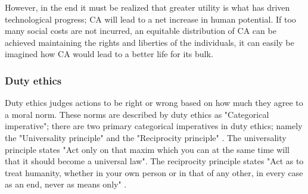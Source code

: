 
However, in the end it must be realized that greater utility is what has driven technological progress; CA will lead to a net increase in human potential. If too many social costs are not incurred, an equitable distribution of CA can be achieved maintaining the rights and liberties of the individuals, it can easily be imagined how CA would lead to a better life for its bulk.


\subsubsection{Duty ethics}

Duty ethics judges actions to be right or wrong based on how much they agree to a moral norm. These norms are described by duty ethics as "Categorical imperative"; there are two primary categorical imperatives in duty ethics; namely the "Universality principle" and the "Reciprocity principle" \cite[ch. 3.8]{Ethics_textbook}. The universality principle states "Act only on that maxim which you can at the same time will that it should become a universal law". The reciprocity principle states "Act as to treat humanity, whether in your own person or in that of any other, in every case as an end, never as means only" \cite[ch. 3.8]{Ethics_textbook}.

